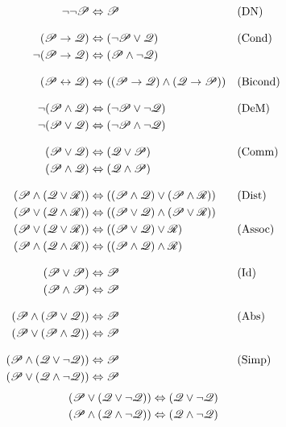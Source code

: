 \begin{align*}
\lnot\lnot \mathscr{P} & \Leftrightarrow \mathscr{P} && \text{(DN)}\\[2ex]
(\mathscr{P} \rightarrow \mathscr{Q}) & \Leftrightarrow (\lnot \mathscr{P} \lor \mathscr{Q})
&& \text{(Cond)}\\
\lnot(\mathscr{P} \rightarrow \mathscr{Q}) & \Leftrightarrow (\mathscr{P} \land \lnot\mathscr{Q}) \\[2ex]
(\mathscr{P} \leftrightarrow \mathscr{Q}) & \Leftrightarrow ((\mathscr{P} \rightarrow \mathscr{Q}) \land  (\mathscr{Q} \rightarrow \mathscr{P}))
&& \text{(Bicond)}\\[2ex]
\lnot(\mathscr{P} \land \mathscr{Q}) & \Leftrightarrow (\lnot\mathscr{P} \lor \lnot\mathscr{Q})
&& \text{(DeM)}\\
\lnot(\mathscr{P} \lor \mathscr{Q}) & \Leftrightarrow (\lnot\mathscr{P} \land \lnot\mathscr{Q}) \\[2ex]
(\mathscr{P} \lor \mathscr{Q}) & \Leftrightarrow (\mathscr{Q} \lor \mathscr{P}) & &\text{(Comm)}\\
(\mathscr{P} \land \mathscr{Q}) & \Leftrightarrow (\mathscr{Q} \land \mathscr{P})\\[2ex]
(\mathscr{P} \land (\mathscr{Q} \lor \mathscr{R})) & \Leftrightarrow ((\mathscr{P} \land \mathscr{Q}) \lor (\mathscr{P} \land \mathscr{R}))
&& \text{(Dist)}\\
(\mathscr{P} \lor (\mathscr{Q} \land \mathscr{R})) & \Leftrightarrow ((\mathscr{P} \lor \mathscr{Q}) \land (\mathscr{P} \lor \mathscr{R}))\\
(\mathscr{P} \lor (\mathscr{Q} \lor \mathscr{R})) & \Leftrightarrow ((\mathscr{P} \lor \mathscr{Q}) \lor \mathscr{R}) & &\text{(Assoc)}\\
(\mathscr{P} \land (\mathscr{Q} \land \mathscr{R})) & \Leftrightarrow ((\mathscr{P} \land \mathscr{Q}) \land \mathscr{R})\\[2ex]
(\mathscr{P} \lor \mathscr{P}) & \Leftrightarrow \mathscr{P} && \text{(Id)}\\
(\mathscr{P} \land \mathscr{P}) & \Leftrightarrow \mathscr{P}\\[2ex]
(\mathscr{P} \land (\mathscr{P} \lor \mathscr{Q})) & \Leftrightarrow \mathscr{P}&& \text{(Abs)}\\
(\mathscr{P} \lor (\mathscr{P} \land \mathscr{Q})) & \Leftrightarrow \mathscr{P}\\[2ex]
(\mathscr{P} \land (\mathscr{Q} \lor \lnot\mathscr{Q})) & \Leftrightarrow \mathscr{P}  && \text{(Simp)}\\
(\mathscr{P} \lor (\mathscr{Q} \land \lnot\mathscr{Q})) & \Leftrightarrow \mathscr{P}
\end{align*}
\begin{align*}
(\mathscr{P} \lor (\mathscr{Q} \lor \lnot\mathscr{Q})) & \Leftrightarrow (\mathscr{Q} \lor \lnot\mathscr{Q}) \\
(\mathscr{P} \land (\mathscr{Q} \land \lnot\mathscr{Q})) & \Leftrightarrow (\mathscr{Q} \land \lnot\mathscr{Q})
\end{align*}
\fi
